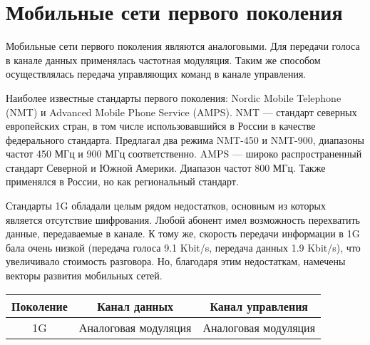 \section{Мобильные сети первого поколения}
Мобильные сети первого поколения являются аналоговыми. Для передачи голоса в канале данных применялась частотная модуляция. Таким же способом осуществлялась передача управляющих команд в канале управления.

Наиболее известные стандарты первого поколения: Nordic Mobile Telephone (NMT) и Advanced Mobile Phone Service (AMPS).
NMT --- стандарт северных европейских стран, в том числе использовавшийся в России в качестве федерального стандарта. Предлагал два режима NMT-450 и NMT-900, диапазоны частот 450 МГц и 900 МГц соответственно.
AMPS --- широко распространенный стандарт Северной и Южной Америки. Диапазон частот 800 МГц. Также применялся в России, но как региональный стандарт.

Стандарты 1G обладали целым рядом недостатков, основным из которых является отсутствие шифрования. Любой абонент имел возможность перехватить данные, передаваемые в канале. К тому же, скорость передачи информации в 1G бала очень низкой (передача голоса 9.1 Kbit/s, передача данных 1.9 Kbit/s), что увеличивало стоимость разговора. Но, благодаря этим недостаткам, намечены векторы развития мобильных сетей.

\begin{table}[H]
    \centering
    \begin{tabular}{|c|c|c|}
        \hline
        Поколение & Канал данных & Канал управления\\
        \hline
        1G & Аналоговая модуляция & Аналоговая модуляция\\
        \hline
    \end{tabular}
\end{table}